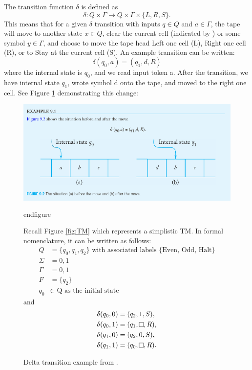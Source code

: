 The transition function $\delta$ is defined as \[\delta: Q \times \Gamma \rightarrow Q \times \Gamma \times \{L, R, S\}.\]
This means that for a given $\delta$ transition with inputs $q \in Q$ and $a \in \Gamma$, the tape will move to another state $x \in Q$, clear the current cell (indicated by \raisebox{0.1cm}{\fbox{}}) or some symbol $y \in \Gamma$, and choose to move the tape head Left one cell (L), Right one cell (R), or to Stay at the current cell (S).
An example transition can be written: \[\delta(q_{0}, a) = (q_{1}, d, R)\] where the internal state is $q_{0}$, and we read input token a.
After the transition, we have internal state $q_{1}$, wrote symbol d onto the tape, and moved to the right one cell.
See Figure \ref{fig:DeltaTransition} demonstrating this change:

\begin{figure}[htb]
    \centering
    \includegraphics[width=16cm]{Images/deltatransition.png}
       \caption{Delta transition example from \cite{IntroFormLangAuto}.}
           \label{fig:DeltaTransition}
end{figure}

Recall Figure \ref{fig:TM} which represents a simplistic TM.
In formal nomenclature, it can be written as follows:
\[
    \begin{aligned}
        Q &= \{q_{0}, q_{1}, q_{2}\} \text{ with associated labels \{Even, Odd, Halt\}}\\
        \Sigma &= {0,1}\\
        \Gamma &= {0,1}\\
        F &= \{q_{2}\}\\
        q_{0} &\in \text{ Q as the initial state}
    \end{aligned}
\]
and
\[
    \begin{aligned}
        \delta (q_{0}, 0) &= (q_{2}, 1, S),\\
        \delta (q_{0}, 1) &= (q_{1}, \raisebox{0.1cm}{\fbox{}}, R),\\
        \delta (q_{1}, 0) &= (q_{2}, 0, S),\\
        \delta (q_{1}, 1) &= (q_{0}, \raisebox{0.1cm}{\fbox{}}, R).\\
    \end{aligned}
\]


\end{figure}

